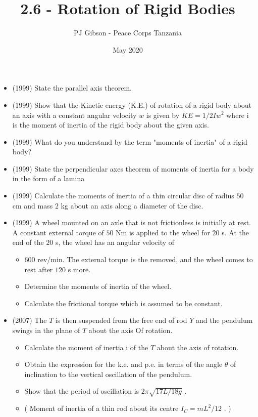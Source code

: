 \documentclass{article}
\title{\textbf{2.6 - Rotation of Rigid Bodies}}
\author{PJ Gibson - Peace Corps Tanzania}
\date{May 2020}
\begin{document}
\maketitle

\begin{itemize}
\item (1999)  State the parallel axis theorem.
\item (1999)  Show that the Kinetic energy (K.E.) of rotation of a rigid body about an axis with a constant angular velocity $ w$ is given by $ KE =1/2Iw^{2}$ where i is the moment of inertia of the rigid body about the given axis.
\item (1999)  What do you understand by the term "moments of inertia" of a rigid body?
\item (1999)  State the perpendicular axes theorem of moments of inertia for a body in the form of a lamina
\item (1999)  Calculate the moments of inertia of a thin circular disc of radius $ 50$ cm and mass $ 2$ kg about an axis along a diameter of the disc.
\item (1999)  A wheel mounted on an axle that is not frictionless is initially at rest. A constant external torque of $ 50$ Nm is applied to the wheel for $ 20$ s. At the end of the $ 20$ s, the wheel has an angular velocity of
 \begin{itemize}
\item $ 600$ rev/min. The external torque is the removed, and the wheel comes to rest after $ 120$ s more.
\item Determine the moments of inertia of the wheel.
\item Calculate the frictional torque which is assumed to be constant. 
\end{itemize}
\item (2007)  The $ T$ is then suspended from the free end of rod $ Y$ and the pendulum swings in the plane of $ T$ about the axis Of rotation.
 \begin{itemize}
\item Calculate the moment of inertia i of the $ T$ about the axis of rotation. 
\item Obtain the expression for the k.e. and p.e. in terms of the angle $ \theta $ of inclination to the vertical oscillation of the pendulum. 
\item Show that the period of oscillation is $ 2\pi\sqrt{17L/18g}$ . 
\item ( Moment of inertia of a thin rod about its centre $ I_{C}=mL^{2}/12$ . )

\end{itemize}
\end{itemize}
\end{document}
